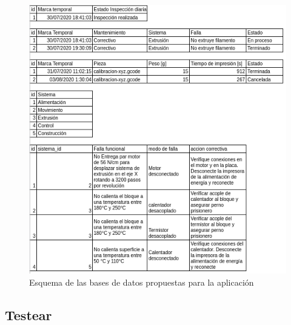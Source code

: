\begin{figure}[H]
\centering
\includegraphics[scale=0.7]{images/esquemadb.png}
\caption{Esquema de las bases de datos propuestas para la aplicación}
\label{esquemadb}
\end{figure}


\subsection{Testear}


